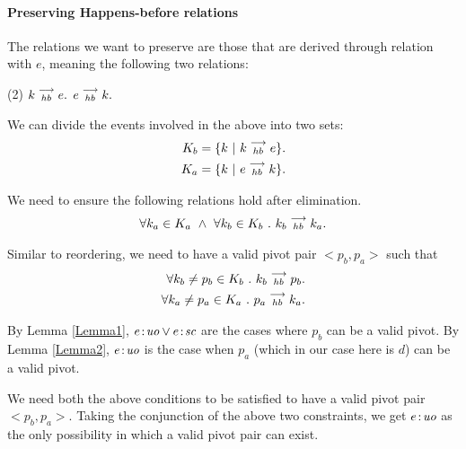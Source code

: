 \paragraph{Preserving Happens-before relations}
        
    The relations we want to preserve are those that are derived through relation with $e$, meaning the following two relations:
    \begin{tasks}(2)
        \task $k\stackrel{\longrightarrow}{_{hb}}e.$
        \task $e\stackrel{\longrightarrow}{_{hb}}k.$
    \end{tasks}

    We can divide the events involved in the above into two sets:
    \begin{align*}
        K_b = \{k \ | \ k\stackrel{\longrightarrow}{_{hb}}e \}. \\
        K_a = \{k \ | \ e\stackrel{\longrightarrow}{_{hb}}k \}. 
    \end{align*}
   
    We need to ensure the following relations hold after elimination.
    \begin{align}
        \forall k_a \in K_a \ \wedge \ \forall k_b \in K_b \ . \ \reln{k_b}{hb}{k_a}.
    \end{align}
    
    Similar to reordering, we need to have a valid pivot pair $<p_b, p_a>$ such that 
    \begin{align}
        \forall k_b \neq p_b \in K_b \ . \ k_b\stackrel{\longrightarrow}{_{hb}}p_b. \\
        \forall k_a \neq p_a \in K_a \ . \ p_a\stackrel{\longrightarrow}{_{hb}}k_a. 
    \end{align}

    By Lemma \ref{Lemma1}, $e\!:\!\textit{uo} \vee e\!:\!\textit{sc}$ are the cases where $p_b$ can be a valid pivot. 
    By Lemma \ref{Lemma2}, $e\!:\!\textit{uo}$ is the case when $p_a$ (which in our case here is $d$) can be a valid pivot. 
    
    We need both the above conditions to be satisfied to have a valid pivot pair $<p_b, p_a>$. 
    Taking the conjunction of the above two constraints, we get $e\!:\!\textit{uo}$ as the only possibility in which a valid pivot pair can exist. 
    